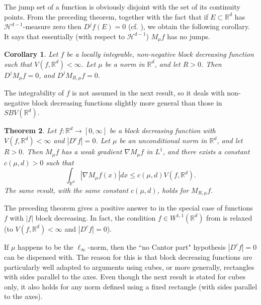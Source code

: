 \documentclass[12pt]{amsart}
\numberwithin{equation}{section}
\theoremstyle{plain}
\newtheorem{theorem}{Theorem}
\newtheorem{corollary}[theorem]{Corollary}
\theoremstyle{definition}
\theoremstyle{remark}
\begin{document}
The jump set of a function is obviously disjoint with the set of its continuity
points.  From the preceding theorem, together
with the fact that if $E\subset \mathbb{R}^d$ has $\mathcal{H}^{d-1}$-measure
zero then $D^j f (E) = 0$ (cf. \cite[Formula 3.90, p. 184]{AFP}),
 we obtain the following corollary. It says that essentially
(with respect to $\mathcal{H}^{d-1}$) $M_\mu f$ has no jumps.

\begin{corollary}\label{nojump}
  Let $f$ be a locally integrable, non-negative block decreasing function such that
   $V(f,\mathbb{R}^d)<\infty$. Let $\mu$ be a norm in $\mathbb{R}^d$,
   and let $R > 0$.
   Then $D^j M_\mu f = 0$, and $D^j M_{R,\mu} f = 0$.
\end{corollary}

 The integrability of $f$ is not assumed
 in the next result, so it deals
 with non-negative block decreasing functions slightly
 more general than those in $SBV(\mathbb{R}^d)$.

\begin{theorem}\label{sbv}
  Let $f:\mathbb{R}^d\to [0, \infty]$ be a block decreasing function with
   $V(f,\mathbb{R}^d)<\infty$ and $|D^c f| = 0$. Let $\mu$ be an
  unconditional norm in $\mathbb{R}^d$, and let $R > 0$. Then $M_\mu f$ has a weak gradient
  $\nabla M_\mu f$ in $L^1$, and there exists a constant $c(\mu,d) > 0$
  such that
  \begin{equation*}
    \int_{\mathbb{R}^d}|\nabla M_\mu f(x)|dx\le
    c(\mu,d) V(f,\mathbb{R}^d).
  \end{equation*}
The same result, with the same constant $c(\mu,d)$, holds for $M_{R,\mu} f$.
\end{theorem}

The preceding theorem gives a positive answer to \cite[Question 1]{HaOn} in the special case of
functions $f$ with $|f|$  block decreasing. In
fact, the condition $f\in W^{1,1}(\mathbb{R}^d)$ from \cite[Question 1]{HaOn} is relaxed (to
$V(f,\mathbb{R}^d)<\infty$ and $|D^c f| = 0$).

If $\mu$ happens to be the $\ell_\infty$-norm, then the ``no Cantor part" hypothesis
$|D^c f| = 0$ can be dispensed with. The reason for this
is that block decreasing functions are particularly well adapted to
arguments using  cubes, or more generally, rectangles with sides parallel
to the axes. Even though the next result is stated for cubes only,
it also holds for any norm defined using a fixed rectangle
(with sides parallel
to the axes).
\end{document}
